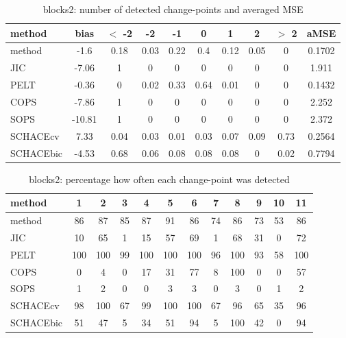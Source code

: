 \begin{table}[ht]
\centering
\begin{tabular}{l|c|ccccccc|c}
  \hline
method & bias & $<$ -2 & -2 & -1 & 0 & 1 & 2 & $>$ 2 & aMSE \\ 
  \hline
method &  -1.6 &  0.18 &  0.03 &  0.22 &   0.4 &  0.12 &  0.05 &     0 & 0.1702 \\ 
  JIC & -7.06 &     1 &     0 &     0 &     0 &     0 &     0 &     0 & 1.911 \\ 
  PELT & -0.36 &     0 &  0.02 &  0.33 &  0.64 &  0.01 &     0 &     0 & 0.1432 \\ 
  COPS & -7.86 &     1 &     0 &     0 &     0 &     0 &     0 &     0 & 2.252 \\ 
  SOPS & -10.81 &     1 &     0 &     0 &     0 &     0 &     0 &     0 & 2.372 \\ 
  SCHACEcv &  7.33 &  0.04 &  0.03 &  0.01 &  0.03 &  0.07 &  0.09 &  0.73 & 0.2564 \\ 
  SCHACEbic & -4.53 &  0.68 &  0.06 &  0.08 &  0.08 &  0.08 &     0 &  0.02 & 0.7794 \\ 
   \hline
\end{tabular}
\caption{blocks2: number of detected change-points and averaged MSE} 
\label{tab:blocks2Njumps}
\end{table}
\begin{table}[ht]
\centering
\begin{tabular}{l|ccccccccccc}
  \hline
method & 1 & 2 & 3 & 4 & 5 & 6 & 7 & 8 & 9 & 10 & 11 \\ 
  \hline
method &     86 &     87 &     85 &     87 &     91 &     86 &     74 &     86 &     73 &     53 &     86 \\ 
  JIC &     10 &     65 &      1 &     15 &     57 &     69 &      1 &     68 &     31 &      0 &     72 \\ 
  PELT &    100 &    100 &     99 &    100 &    100 &    100 &     96 &    100 &     93 &     58 &    100 \\ 
  COPS &      0 &      4 &      0 &     17 &     31 &     77 &      8 &    100 &      0 &      0 &     57 \\ 
  SOPS &      1 &      2 &      0 &      0 &      3 &      3 &      0 &      3 &      0 &      1 &      2 \\ 
  SCHACEcv &     98 &    100 &     67 &     99 &    100 &    100 &     67 &     96 &     65 &     35 &     96 \\ 
  SCHACEbic &     51 &     47 &      5 &     34 &     51 &     94 &      5 &    100 &     42 &      0 &     94 \\ 
   \hline
\end{tabular}
\caption{blocks2: percentage how often each change-point was detected} 
\label{tab:blocks2Detections}
\end{table}
